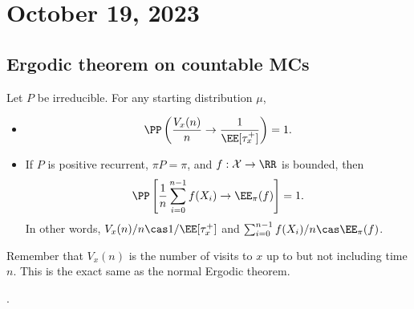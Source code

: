 \section{October 19, 2023}

\subsection{Ergodic theorem on countable MCs}

\begin{theorem}
\thmlabel

Let $P$ be irreducible. For any starting distribution $\mu$, 

\begin{itemize}
	\item \[\PP\left(\frac{V_x(n)}{n} \rightarrow \frac{1}{\EE[\tau_x^+]}\right) = 1.\]
	\item If $P$ is positive recurrent, $\pi P = \pi$, and $f : \mathcal{X}\rightarrow \RR$ is bounded, then 
		\[\PP\left[\frac{1}{n}\sum_{i = 0}^{n-1}f(X_i)\rightarrow \EE_{\pi}(f)\right] = 1.\] 
		In other words, $V_x(n)/n\cas 1/\EE[\tau_x^+]$ and $\sum_{i=0}^{n-1}f(X_i)/n\cas \EE_{\pi}(f)$. 
\end{itemize}
\end{theorem}

Remember that $V_x(n)$ is the number of visits to $x$ up to but not including time $n$. This is the exact same as the normal Ergodic theorem. 

. 
